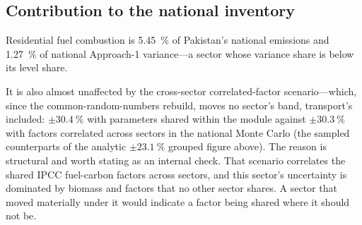 \subsection{Contribution to the national inventory}

Residential fuel combustion is \SI{5.45}{\percent} of Pakistan's national emissions and
\SI{1.27}{\percent} of national Approach-1 variance---a sector whose variance share is
below its level share.

It is also almost unaffected by the cross-sector correlated-factor scenario---which,
since the common-random-numbers rebuild, moves no sector's band, transport's included:
$\pm\SI{30.4}{\percent}$ with parameters shared within the module against
$\pm\SI{30.3}{\percent}$ with factors correlated across sectors in the national Monte
Carlo (the sampled counterparts of the analytic $\pm\SI{23.1}{\percent}$ grouped figure
above). The reason is structural and worth stating as an internal check. That scenario
correlates the shared IPCC fuel-carbon factors across sectors, and this sector's uncertainty is
dominated by biomass \CHfour{} and \NtwoO{} factors that no other sector shares. A sector that
moved materially under it would indicate a factor being shared where it should not be.
